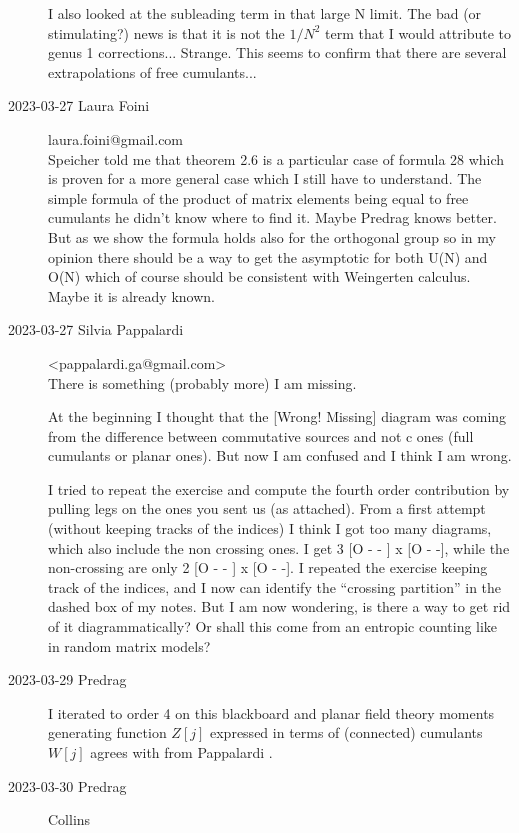 \begin{description}
I also looked at the subleading term in that large N limit. The bad (or
stimulating?) news is that it is not the $1/N^2$ term that I would
attribute to genus 1 corrections... Strange. This seems to confirm that
there are several extrapolations of free cumulants...

   \item[2023-03-27 Laura Foini]  laura.foini@gmail.com\\
Speicher told me that theorem 2.6 is a particular case of formula 28
which is proven for a more general case which I still have to understand.
The simple formula of the product of matrix elements being equal to free
cumulants he didn't know where to find it.
Maybe Predrag knows better.
But as we show the formula holds also for the orthogonal group so in my
opinion there should be a way to get the asymptotic for both U(N) and
O(N) which of course should be consistent with Weingerten calculus. Maybe
it is already known.

   \item[2023-03-27 Silvia Pappalardi] <pappalardi.ga@gmail.com>\\
There is something (probably more) I am missing.

At the beginning I thought that the [Wrong! Missing] diagram was coming from
the difference between commutative sources and not c ones (full cumulants or
planar ones). But now I am confused and I think I am wrong.

I tried to repeat the exercise and compute the fourth order contribution by
pulling legs on the ones you sent us (as attached). From a first attempt
(without keeping tracks of the indices) I think I got too many diagrams,
which also include the non crossing ones. I get 3  [O - - ] x [O - -], while
the non-crossing are only 2  [O - - ] x [O - -]. I repeated the exercise
keeping track of the indices, and I now can identify the “crossing partition”
in the dashed box of my notes. But I am now wondering, is there a way to get
rid of it diagrammatically? Or shall this come from an entropic counting like
in random matrix models?

   \item[2023-03-29 Predrag]
I iterated  to order 4 on this
 {blackboard}
and planar field theory moments generating function $Z[j]$ expressed in
terms of (connected) cumulants $W[j]$ agrees with 
from Pappalardi \etal{}.


   \item[2023-03-30 Predrag]  Collins \etal{}\\


\end{description}
